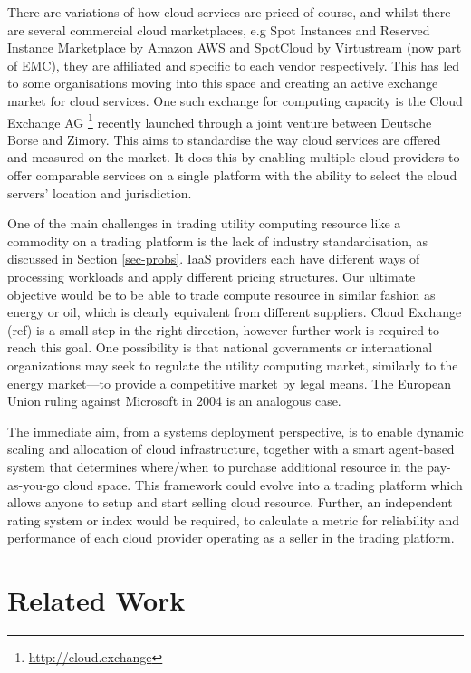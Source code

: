 \documentclass[conference,10pt]{IEEEtran}
\begin{document}
There are variations of how cloud services are priced of course, and whilst there are several commercial cloud marketplaces, e.g Spot Instances and Reserved Instance Marketplace by Amazon AWS and SpotCloud by Virtustream (now part of EMC), they are affiliated and specific to each vendor respectively. 
This has led to some organisations moving into this space and creating an active exchange market for cloud services. One such exchange for computing capacity is the Cloud Exchange AG \footnote{\url{http://cloud.exchange}} recently launched through a joint venture between Deutsche Borse and Zimory.  This aims to standardise the way cloud services are offered and measured on the market. It does this by enabling multiple cloud providers to offer comparable services on a single platform with the ability to select the cloud servers' location and jurisdiction.

One of the main challenges in trading utility computing resource like a commodity on a trading platform is the lack of industry standardisation, as discussed in Section \ref{sec-probs}.
IaaS providers each have different ways of processing workloads and apply different pricing structures. Our ultimate objective would be to be able to trade compute resource in similar fashion as energy or oil, which is clearly equivalent from different suppliers.
Cloud Exchange (ref) is a small step in the right direction, however further work is required to reach this goal. One possibility is that national governments or international organizations may seek to regulate the utility computing market, similarly to the energy market---to provide a competitive market by legal means. The European Union ruling against Microsoft in 2004 is an analogous case.


The immediate aim, from a systems deployment perspective, is to enable
dynamic scaling and allocation of cloud infrastructure, together with a smart agent-based system that determines where/when to purchase  additional resource 
in the pay-as-you-go cloud space. 
This framework could evolve into 
a trading platform which allows anyone to setup and start selling cloud resource. Further, an independent rating system or index would be required, to calculate a metric for reliability and performance of each cloud provider operating as a seller in the trading platform.


\section{Related Work}
\label{sec-relw}
\end{document}
